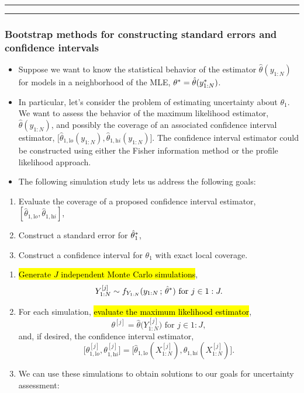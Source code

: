 \documentclass[]{article}
\providecommand{\tightlist}{%
  \setlength{\itemsep}{0pt}\setlength{\parskip}{0pt}}
\begin{document}
\begin{center}\rule{0.5\linewidth}{\linethickness}\end{center}

\begin{center}\rule{0.5\linewidth}{\linethickness}\end{center}

\subsubsection{Bootstrap methods for constructing standard errors and
confidence
intervals}\label{bootstrap-methods-for-constructing-standard-errors-and-confidence-intervals}

\begin{itemize}
\item
  Suppose we want to know the statistical behavior of the estimator
  \(\hat\theta({y_{1:N}})\) for models in a neighborhood of the MLE,
  \(\theta^*=\hat\theta(y_{1:N}^*)\).
\item
  In particular, let's consider the problem of estimating uncertainty
  about \(\theta_1\). We want to assess the behavior of the maximum
  likelihood estimator, \(\hat\theta({y_{1:N}})\), and possibly the
  coverage of an associated confidence interval estimator,
  \(\big[\hat\theta_{1,\mathrm lo}({y_{1:N}}),\hat\theta_{1,\mathrm hi}({y_{1:N}})\big]\).
  The confidence interval estimator could be constructed using either
  the Fisher information method or the profile likelihood approach.
\item
  The following simulation study lets us address the following goals: 
\end{itemize}

\begin{enumerate}
\def\labelenumi{(\Alph{enumi})}
\tightlist
\item
  Evaluate the coverage of a proposed confidence interval estimator,
  \([\hat\theta_{1,\mathrm lo},\hat\theta_{1,\mathrm hi}]\), 
\item
  Construct a standard error for \(\hat\theta_1^*\), 
\item
  Construct a confidence interval for \(\theta_1\) with exact local
  coverage.
\end{enumerate}

\begin{enumerate}
\def\labelenumi{\arabic{enumi}.}
\item
  \hl{Generate $J$ independent Monte Carlo simulations},
  \[Y_{1:N}^{[j]} \sim f_{Y_{1:N}}(y_{1:N}\, ; \,\hat\theta^*)\mbox{ for } j\in 1:J.\]
\item
  For each simulation, \hl{evaluate the maximum likelihood estimator},
  \[ \theta^{[j]} = \hat\theta\big(Y_{1:N}^{[j]}\big)\mbox{ for } j\in 1:J,\]
  and, if desired, the confidence interval estimator,
  \[ \big[\theta^{[j]}_{1,\mathrm lo},\theta^{[j]}_{1,\mathrm hi}\big] = \big[\hat\theta_{1,\mathrm lo}({X^{[j]}_{1:N}}),\hat\theta_{1,\mathrm hi}({X^{[j]}_{1:N}})\big].\]
\item
  We can use these simulations to obtain solutions to our goals for
  uncertainty assessment: 
\end{enumerate}
\end{document}
